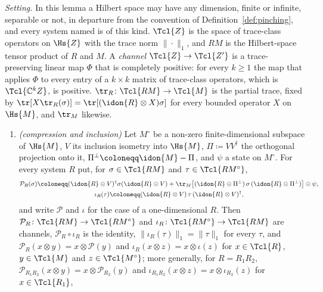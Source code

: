 \begin{lemma}\label{lem:register-compression}
\emph{Setting.} In this lemma a Hilbert space may have any dimension, finite
or infinite, separable or not, in departure from the convention of
Definition~\ref{def:pinching}, and every system named is of this kind.
$\Tcl{Z}$ is the space of trace-class operators on $\Hs{Z}$ with the trace
norm $\|\cdot\|_1$, and $RM$ is the Hilbert-space tensor product of $R$ and
$M$. A \emph{channel} $\Tcl{Z}\to\Tcl{Z'}$ is a trace-preserving linear map
$\Phi$ that is completely positive: for every $k\ge1$ the map that applies
$\Phi$ to every entry of a $k\times k$ matrix of trace-class operators, which
is $\Tcl{\mathbb{C}^kZ}$, is positive. $\tr_R\colon\Tcl{RM}\to\Tcl{M}$ is the
partial trace, fixed by $\tr[X\tr_R(\sigma)]=\tr[(\idon{R}\otimes X)\sigma]$
for every bounded operator $X$ on $\Hs{M}$, and $\tr_M$ likewise.
\begin{enumerate}[label=(\roman*),leftmargin=2.6em]
\item \emph{(compression and inclusion)} Let $M^{\circ}$ be a non-zero
  finite-dimensional subspace of $\Hs{M}$, $V$ its inclusion isometry into
  $\Hs{M}$, $\Pi\coloneqq VV^{\dagger}$ the orthogonal projection onto it,
  $\Pi^{\perp}\coloneqq\idon{M}-\Pi$, and $\psi$ a state on $M^{\circ}$. For
  every system $R$ put, for $\sigma\in\Tcl{RM}$ and
  $\tau\in\Tcl{RM^{\circ}}$,
  \begin{equation}\label{eq:compression}
  \begin{gathered}
    \mathcal{P}_R(\sigma)\coloneqq
      (\idon{R}\otimes V)^{\dagger}\sigma(\idon{R}\otimes V)
      +\tr_M\big[(\idon{R}\otimes\Pi^{\perp})\,\sigma\,
        (\idon{R}\otimes\Pi^{\perp})\big]\otimes\psi ,\\
    \iota_R(\tau)\coloneqq(\idon{R}\otimes V)\,\tau\,(\idon{R}\otimes V)^{\dagger},
  \end{gathered}
  \end{equation}
  and write $\mathcal{P}$ and $\iota$ for the case of a one-dimensional $R$.
  Then $\mathcal{P}_R\colon\Tcl{RM}\to\Tcl{RM^{\circ}}$ and
  $\iota_R\colon\Tcl{RM^{\circ}}\to\Tcl{RM}$ are channels,
  $\mathcal{P}_R\circ\iota_R$ is the identity, $\|\iota_R(\tau)\|_1=\|\tau\|_1$
  for every $\tau$, and $\mathcal{P}_R(x\otimes y)=x\otimes\mathcal{P}(y)$ and
  $\iota_R(x\otimes z)=x\otimes\iota(z)$ for $x\in\Tcl{R}$, $y\in\Tcl{M}$ and
  $z\in\Tcl{M^{\circ}}$; more generally, for $R=R_1R_2$,
  $\mathcal{P}_{R_1R_2}(x\otimes y)=x\otimes\mathcal{P}_{R_2}(y)$ and
  $\iota_{R_1R_2}(x\otimes z)=x\otimes\iota_{R_2}(z)$ for $x\in\Tcl{R_1}$,

\end{enumerate}
\end{lemma}
